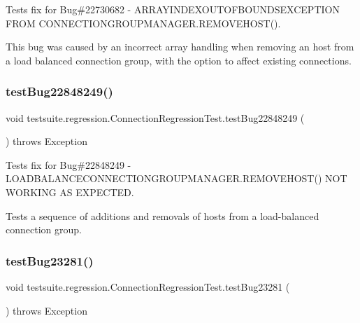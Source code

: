 Tests fix for Bug\#22730682 -\/ A\+R\+R\+A\+Y\+I\+N\+D\+E\+X\+O\+U\+T\+O\+F\+B\+O\+U\+N\+D\+S\+E\+X\+C\+E\+P\+T\+I\+ON F\+R\+OM C\+O\+N\+N\+E\+C\+T\+I\+O\+N\+G\+R\+O\+U\+P\+M\+A\+N\+A\+G\+E\+R.\+R\+E\+M\+O\+V\+E\+H\+O\+S\+T().

This bug was caused by an incorrect array handling when removing an host from a load balanced connection group, with the option to affect existing connections. \mbox{\label{classtestsuite_1_1regression_1_1_connection_regression_test_a9c80414050a22a9ebafdb247f107d6f2}} 
\subsubsection{\texorpdfstring{test\+Bug22848249()}{testBug22848249()}}
{\footnotesize\ttfamily void testsuite.\+regression.\+Connection\+Regression\+Test.\+test\+Bug22848249 (\begin{DoxyParamCaption}{ }\end{DoxyParamCaption}) throws Exception}

Tests fix for Bug\#22848249 -\/ L\+O\+A\+D\+B\+A\+L\+A\+N\+C\+E\+C\+O\+N\+N\+E\+C\+T\+I\+O\+N\+G\+R\+O\+U\+P\+M\+A\+N\+A\+G\+E\+R.\+R\+E\+M\+O\+V\+E\+H\+O\+S\+T() N\+OT W\+O\+R\+K\+I\+NG AS E\+X\+P\+E\+C\+T\+ED.

Tests a sequence of additions and removals of hosts from a load-\/balanced connection group. \mbox{\label{classtestsuite_1_1regression_1_1_connection_regression_test_a677e7bbd5b69eecc56a23dab94b43440}} 
\subsubsection{\texorpdfstring{test\+Bug23281()}{testBug23281()}}
{\footnotesize\ttfamily void testsuite.\+regression.\+Connection\+Regression\+Test.\+test\+Bug23281 (\begin{DoxyParamCaption}{ }\end{DoxyParamCaption}) throws Exception}

